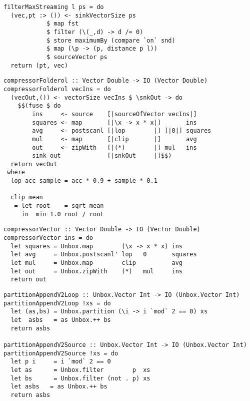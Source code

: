 \begin{lstlisting}[float,label=l:a:bench:filterMaxStreaming,caption=Streaming implementation of filterMax]
filterMaxStreaming l ps = do
  (vec,pt :> ()) <- sinkVectorSize ps
            $ map fst
            $ filter (\(_,d) -> d /= 0)
            $ store maximumBy (compare `on` snd)
            $ map (\p -> (p, distance p l))
            $ sourceVector ps
  return (pt, vec)
\end{lstlisting}

\begin{lstlisting}[float,label=l:a:bench:compressorFolderol,caption=Folderol implementation of compressor]
compressorFolderol :: Vector Double -> IO (Vector Double)
compressorFolderol vecIns = do
  (vecOut,()) <- vectorSize vecIns $ \snkOut -> do
    $$(fuse $ do
        ins     <- source    [|sourceOfVector vecIns|]
        squares <- map       [|\x -> x * x|]       ins
        avg     <- postscanl [|lop        |] [|0|] squares
        mul     <- map       [|clip       |]       avg
        out     <- zipWith   [|(*)        |] mul   ins
        sink out             [|snkOut     |]$$)
  return vecOut
 where
  lop acc sample = acc * 0.9 + sample * 0.1

  clip mean
   = let root    = sqrt mean
     in  min 1.0 root / root
\end{lstlisting}


\begin{lstlisting}[float,label=l:a:bench:compressorVector,caption=Vector implementation of compressor]
compressorVector :: Vector Double -> IO (Vector Double)
compressorVector ins = do
  let squares = Unbox.map        (\x -> x * x) ins
  let avg     = Unbox.postscanl' lop   0       squares
  let mul     = Unbox.map        clip          avg
  let out     = Unbox.zipWith    (*)   mul     ins
  return out
\end{lstlisting}

\begin{lstlisting}[float,label=l:a:bench:partitionAppendVector,caption=Vector implementations of partitionAppend]
partitionAppendV2Loop :: Unbox.Vector Int -> IO (Unbox.Vector Int)
partitionAppendV2Loop !xs = do
  let (as,bs) = Unbox.partition (\i -> i `mod` 2 == 0) xs
  let  asbs   = as Unbox.++ bs
  return asbs

partitionAppendV2Source :: Unbox.Vector Int -> IO (Unbox.Vector Int)
partitionAppendV2Source !xs = do
  let p i     = i `mod` 2 == 0
  let as      = Unbox.filter        p  xs
  let bs      = Unbox.filter (not . p) xs
  let asbs   = as Unbox.++ bs
  return asbs
\end{lstlisting}
